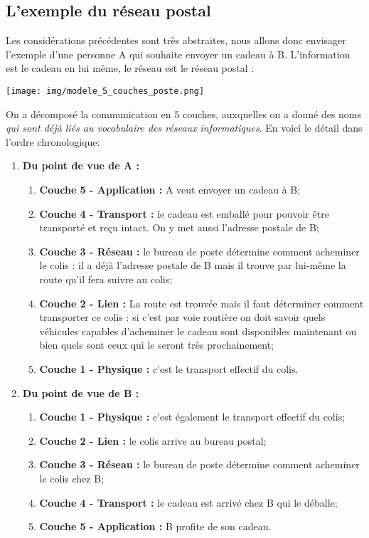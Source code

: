 \documentclass[a4paper,12pt]{book}
\begin{document}
\subsection*{L'exemple du réseau postal}
Les considérations précédentes sont très abstraites, nous allons donc envisager l'exemple d'une personne A qui souhaite envoyer un cadeau à B. L'information est le cadeau en lui même, le réseau est le réseau postal :
\begin{center}
\texttt{[image: img/modele\_5\_couches\_poste.png]}
\end{center}
On a décomposé la communication en 5 couches, auxquelles on a donné des noms \textit{qui sont déjà liés au vocabulaire des réseaux informatiques}. En voici le détail dans l'ordre chronologique:
\begin{enumerate}[--]
	\item 	\textbf{Du point de vue de A :}
			\begin{enumerate}[]
				\item 	\textbf{Couche 5 - Application : } A veut envoyer un cadeau à B;
				\item 	\textbf{Couche 4 - Transport :} le cadeau est emballé pour pouvoir être transporté et reçu intact. On y met aussi l'adresse postale de B;
				\item 	\textbf{Couche 3 - Réseau :} le bureau  de poste détermine comment acheminer le colis : il a déjà l'adresse postale de B mais il trouve par lui-même la route qu'il fera suivre au colis;
				\item 	\textbf{Couche 2 - Lien : } La route est trouvée mais il faut déterminer comment transporter ce colis : si c'est par voie routière on doit savoir quels véhicules capables d'acheminer le cadeau sont disponibles maintenant ou bien quels sont ceux qui le seront très prochainement;
				\item	\textbf{Couche 1 - Physique :} c'est le transport effectif du colis.
			\end{enumerate}
			
	\item 	\textbf{Du point de vue de B :}
				\begin{enumerate}[]
					\item	\textbf{Couche 1 - Physique :} c'est également le transport effectif du colis;			
					\item 	\textbf{Couche 2 - Lien : } le colis arrive au bureau postal;
					\item 	\textbf{Couche 3 - Réseau :} le bureau  de poste détermine comment acheminer le colis chez B;
					\item 	\textbf{Couche 4 - Transport :} le cadeau est arrivé chez B qui le déballe;					
					\item 	\textbf{Couche 5 - Application : } B profite de son cadeau.
				\end{enumerate}
\end{enumerate}
\end{document}
